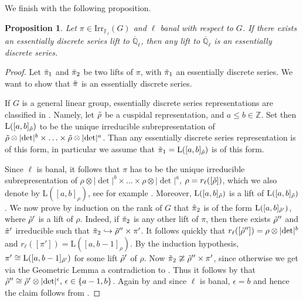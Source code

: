 \documentclass[10pt,a4paper]{article}
\newtheorem{prop}{Proposition}
\theoremstyle{remark}
\theoremstyle{definition}
\newcommand{\fl}{{\overline{\mathbb{F}}_\ell}}
\newcommand{\ql}{{\overline{\mathbb{Q}}_\ell}}
\newcommand{\tpi}{\Tilde{\pi}}
\newcommand{\trho}{{\Tilde{\rho}}}
\newcommand{\irr}{\mathrm{Irr}}
\newcommand{\rl}{r_\ell}
\newcommand{\Z}{\mathrm{L}}
\newcommand{\hra}{\hookrightarrow}
\newcommand{\ZZ}{\mathbb{Z}}
\begin{document}
We finish with the following proposition.
\begin{prop}
    Let $\pi\in\irr_{\fl}(G)$ and $\ell$ banal with respect to $G$.
    If there exists an essentially discrete series lift to $\ql$, then any lift to $\ql$ is an essentially discrete series.
\end{prop}
\begin{proof}
     Let $\tpi_1$ and $\tpi_2$ be two lifts of $\pi$, with $\tpi_1$ an essentially discrete series. We want to show that $\tpi$ is an essentially discrete series.

    If $G$ is a general linear group, essentially discrete series representations are classified in \cite{BerZel77}. Namely, let $\trho$ be a cuspidal representation, and $a\le b\in\ZZ$. Set then $\Z([a,b]_\trho)$ to be the unique irreducible subrepresentation of $\trho\otimes\lvert\det\rvert^b\times\ldots\times\trho\otimes\lvert\det\rvert^a$. Than any essentially discrete series representation is of this form, in particular we assume that $\tpi_1=\Z([a,b]_\trho)$ is of this form.
    
    Since $\ell$ is banal, it follows that $\pi$ has to be the unique irreducible subrepresentation of $\rho\otimes\lvert\det\rvert^b\times\ldots\times\rho\otimes\lvert\det\rvert^a$, $\rho=\rl([\trho])$, which we also denote by $\Z([a,b]_\rho)$, see for example \cite{MinSec14}. Moreover, $\Z([a,b]_\trho)$ is a lift of $\Z([a,b]_\trho)$. We now prove by induction on the rank of $G$ that $\tpi_2$ is of the form $\Z([a,b]_{\trho'})$, where $\trho'$ is a lift of $\rho$.
    Indeed, if $\tpi_2$ is any other lift of $\pi$, then there exists $\trho''$ and $\tpi'$ irreducible such that $\tpi_2\hra\trho''\times \pi'$. It follows quickly that $\rl([\trho''])=\rho\otimes\lvert\det\rvert^b$ and $\rl([\pi'])=\Z([a,b-1]_\rho)$. By the induction hypothesis, $\pi'\cong\Z([a,b-1]_{\trho'})$ for some lift $\trho'$ of $\rho$. Now $\tpi_2\ncong \trho''\times \pi'$, since otherwise we get via the Geometric Lemma a contradiction to \cite[Lemma 7.13]{MinSec14}. Thus it follows by \cite[Theorem 7.23]{MinSec14} that $\trho''\cong\trho'\otimes\lvert\det\rvert^\epsilon,\,\epsilon\in\{a-1,b\}$. Again by \cite[Lemma 7.13]{MinSec14} and since $\ell$ is banal, $\epsilon=b$ and hence the claim follows from \cite[Proposition 7.16]{MinSec14}.


\end{proof}
\end{document}
